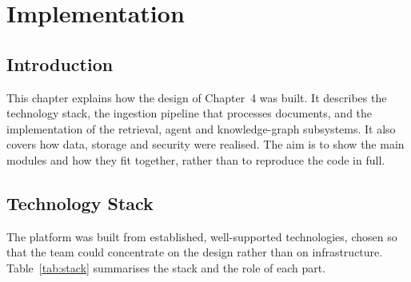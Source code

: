 \chapter{Implementation}
\label{ch:implementation}

\section{Introduction}

This chapter explains how the design of Chapter~4 was built. It describes the
technology stack, the ingestion pipeline that processes documents, and the
implementation of the retrieval, agent and knowledge-graph subsystems. It also
covers how data, storage and security were realised. The aim is to show the main
modules and how they fit together, rather than to reproduce the code in full.

\section{Technology Stack}

The platform was built from established, well-supported technologies, chosen so
that the team could concentrate on the design rather than on infrastructure.
Table~\ref{tab:stack} summarises the stack and the role of each part.

